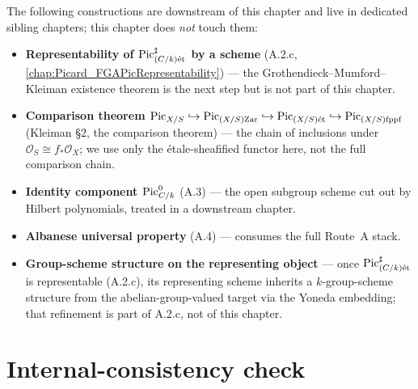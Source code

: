 The following constructions are downstream of this chapter and live in
dedicated sibling chapters; this chapter does \emph{not} touch them:
\begin{itemize}
  \item \textbf{Representability of \(\operatorname{Pic}^\sharp_{(C/k)\mathrm{\acute{e}t}}\) by a scheme}
    (A.2.c, \cref{chap:Picard_FGAPicRepresentability}) --- the
    Grothendieck--Mumford--Kleiman existence theorem is the next step but is
    not part of this chapter.
  \item \textbf{Comparison theorem $\operatorname{Pic}_{X/S} \hookrightarrow
    \operatorname{Pic}_{(X/S)\mathrm{Zar}} \hookrightarrow \operatorname{Pic}_{(X/S)\mathrm{\acute{e}t}} \hookrightarrow
    \operatorname{Pic}_{(X/S)\mathrm{fppf}}$} (Kleiman \S 2, the comparison theorem) --- the chain of inclusions
    under \(\mathcal{O}_S \cong f_*\mathcal{O}_X\); we use only the
    \'etale-sheafified functor here, not the full comparison chain.
  \item \textbf{Identity component \(\operatorname{Pic}^0_{C/k}\)} (A.3) --- the open subgroup
    scheme cut out by Hilbert polynomials, treated in a downstream chapter.
  \item \textbf{Albanese universal property} (A.4) --- consumes the full
    Route~A stack.
  \item \textbf{Group-scheme structure on the representing object} --- once
    \(\operatorname{Pic}^\sharp_{(C/k)\mathrm{\acute{e}t}}\) is representable (A.2.c), its representing scheme
    inherits a \(k\)-group-scheme structure from the abelian-group-valued
    target via the Yoneda embedding; that refinement is part of A.2.c, not
    of this chapter.
\end{itemize}

\section{Internal-consistency check}
\label{sec:relpic_consistency_check}

